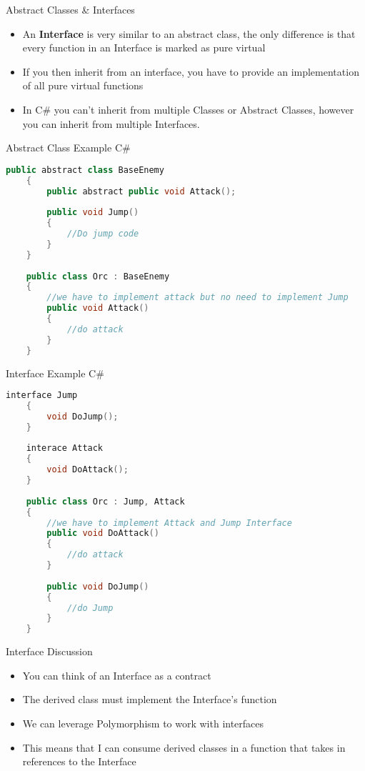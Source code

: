 \begin{frame}{Abstract Classes \& Interfaces}
\begin{itemize}
\pause \item An \textbf{Interface} is very similar to an abstract class, the only difference is that every function in an Interface is marked as pure virtual
\pause \item If you then inherit from an interface, you have to provide an implementation of all pure virtual functions
\pause \item In C\# you can't inherit from multiple Classes or Abstract Classes, however you can inherit from multiple Interfaces.
\end{itemize}
\end{frame}


\begin{frame}[fragile]{Abstract Class Example C\#}
	\begin{lstlisting}[language=C++,basicstyle=\tiny,]
	public abstract class BaseEnemy
	{
		public abstract public void Attack();
		
		public void Jump()
		{
			//Do jump code
		}
	}
	
	public class Orc : BaseEnemy
	{
		//we have to implement attack but no need to implement Jump
		public void Attack()
		{
			//do attack
		}
	}
	\end{lstlisting}
\end{frame}

\begin{frame}[fragile]{Interface Example C\#}
	\begin{lstlisting}[language=C++,basicstyle=\tiny,]
	interface Jump
	{
		void DoJump();
	}
	
	interace Attack
	{
		void DoAttack();
	}
	
	public class Orc : Jump, Attack
	{
		//we have to implement Attack and Jump Interface
		public void DoAttack()
		{
			//do attack
		}
		
		public void DoJump()
		{
			//do Jump
		}
	}
	\end{lstlisting}
\end{frame}


\begin{frame}{Interface Discussion}
\begin{itemize}
	\pause \item You can think of an Interface as a contract
	\pause \item The derived class must implement the Interface's function
	\pause \item We can leverage Polymorphism to work with interfaces
	\pause \item This means that I can consume derived classes in a function that takes in references to the Interface
\end{itemize}
\end{frame}

